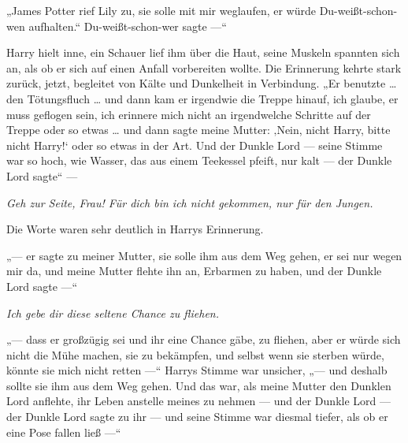 „James Potter rief Lily zu, sie solle mit mir weglaufen, er würde Du-weißt-schon-wen aufhalten.“ Du-weißt-schon-wer sagte —“

Harry hielt inne, ein Schauer lief ihm über die Haut, seine Muskeln spannten sich an, als ob er sich auf einen Anfall vorbereiten wollte. Die Erinnerung kehrte stark zurück, jetzt, begleitet von Kälte und Dunkelheit in Verbindung.
„Er benutzte … den Tötungsfluch … und dann kam er irgendwie die Treppe hinauf, ich glaube, er muss geflogen sein, ich erinnere mich nicht an irgendwelche Schritte auf der Treppe oder so etwas … und dann sagte meine Mutter: ‚Nein, nicht Harry, bitte nicht Harry!‘ oder so etwas in der Art. Und der Dunkle Lord — seine Stimme war so hoch, wie Wasser, das aus einem Teekessel pfeift, nur kalt — der Dunkle Lord sagte“ —

\emph{Geh zur Seite, Frau! Für dich bin ich nicht gekommen, nur für den Jungen.}

Die Worte waren sehr deutlich in Harrys Erinnerung.

„— er sagte zu meiner Mutter, sie solle ihm aus dem Weg gehen, er sei nur wegen mir da, und meine Mutter flehte ihn an, Erbarmen zu haben, und der Dunkle Lord sagte —“

\emph{Ich gebe dir diese seltene Chance zu fliehen.}

„— dass er großzügig sei und ihr eine Chance gäbe, zu fliehen, aber er würde sich nicht die Mühe machen, sie zu bekämpfen, und selbst wenn sie sterben würde, könnte sie mich nicht retten —“ Harrys Stimme war unsicher, „— und deshalb sollte sie ihm aus dem Weg gehen. Und das war, als meine Mutter den Dunklen Lord anflehte, ihr Leben anstelle meines zu nehmen — und der Dunkle Lord — der Dunkle Lord sagte zu ihr — und seine Stimme war diesmal tiefer, als ob er eine Pose fallen ließ —“

